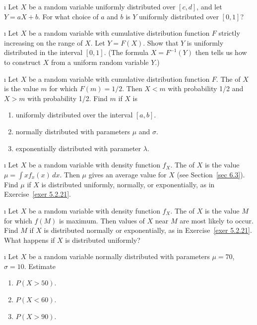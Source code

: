 \begin{LJSItem}
\i\label{exer 5.2.19} Let $X$ be a random variable uniformly distributed over
$[c,d]$, and let
$Y = aX + b$.  For what choice of $a$ and $b$ is $Y$ uniformly distributed over
$[0,1]$?

\i\label{exer 5.2.20} Let $X$ be a random variable with cumulative distribution function $F$
strictly increasing on the range of $X$.  Let $Y = F(X)$.  Show that $Y$ is uniformly
distributed in the interval $[0,1]$.  (The formula $X = F^{-1}(Y)$ then tells us how
to construct $X$ from a uniform random variable $Y$.)

\i\label{exer 5.2.21} Let $X$ be a random variable with cumulative distribution function
$F$.  The   of $X$ is the value $m$ for which $F(m) = 1/2$.  Then
$X < m$ with probability 1/2 and $X > m$ with probability 1/2.  Find $m$ if $X$ is
\begin{enumerate}
\item uniformly distributed over the interval $[a,b]$.

\item normally distributed with parameters $\mu$ and $\sigma$.

\item exponentially distributed with parameter $\lambda$.
\end{enumerate}

\i\label{exer 5.2.22} Let $X$ be a random variable with density function $f_X$. 
The   of $X$ is the value $\mu = \int xf_x(x)\,dx$.  Then $\mu$ gives an
average value for $X$ (see Section~\ref{sec 6.3}).  Find $\mu$ if $X$ is distributed
uniformly, normally, or exponentially, as in Exercise~\ref{exer 5.2.21}.

\i\label{exer 5.2.23} Let $X$ be a random variable with density function $f_X$. 
The   of $X$ is the value $M$ for which $f(M)$ is maximum.  Then values of
$X$ near $M$ are most likely to occur.  Find $M$ if $X$ is distributed normally or
exponentially, as in Exercise~\ref{exer 5.2.21}.  What happens if $X$ is distributed
uniformly?

\i\label{exer 5.2.24} Let $X$ be a random variable normally distributed with
parameters $\mu = 70$,
$\sigma = 10$.  Estimate
\begin{enumerate}
\item $P(X > 50)$.

\item $P(X < 60)$.

\item $P(X > 90)$.


\end{enumerate}
\end{LJSItem}
